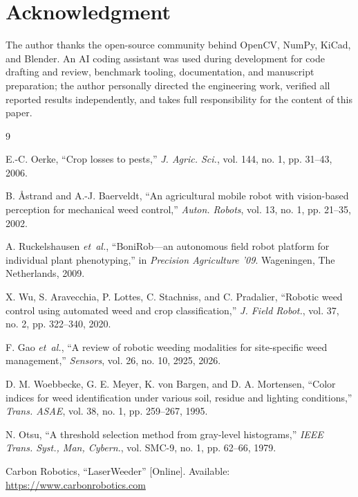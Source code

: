 \documentclass[conference]{IEEEtran}
\begin{document}
\section*{Acknowledgment}
The author thanks the open-source community behind OpenCV, NumPy, KiCad,
and Blender. An AI coding assistant was used during development for
code drafting and review, benchmark tooling, documentation, and manuscript
preparation; the author personally directed the engineering work, verified
all reported results independently, and takes full responsibility for the
content of this paper.


\begin{thebibliography}{9}

 E.-C. Oerke, ``Crop losses to pests,'' \emph{J. Agric.
Sci.}, vol. 144, no. 1, pp. 31--43, 2006.

 B. \AA strand and A.-J. Baerveldt, ``An agricultural
mobile robot with vision-based perception for mechanical weed control,''
\emph{Auton. Robots}, vol. 13, no. 1, pp. 21--35, 2002.

 A. Ruckelshausen \emph{et~al.}, ``BoniRob---an
autonomous field robot platform for individual plant phenotyping,''
in \emph{Precision Agriculture '09}. Wageningen, The Netherlands, 2009.

 X. Wu, S. Aravecchia, P. Lottes, C. Stachniss, and
C. Pradalier, ``Robotic weed control using automated weed and crop
classification,'' \emph{J. Field Robot.}, vol. 37, no. 2, pp. 322--340,
2020.

 F. Gao \emph{et~al.}, ``A review of robotic weeding
modalities for site-specific weed management,'' \emph{Sensors},
vol. 26, no. 10, 2925, 2026.

 D. M. Woebbecke, G. E. Meyer, K. von Bargen, and
D. A. Mortensen, ``Color indices for weed identification under various soil,
residue and lighting conditions,'' \emph{Trans. ASAE}, vol. 38, no. 1,
pp. 259--267, 1995.

 N. Otsu, ``A threshold selection method from gray-level
histograms,'' \emph{IEEE Trans. Syst., Man, Cybern.}, vol. SMC-9, no. 1,
pp. 62--66, 1979.

 Carbon Robotics, ``LaserWeeder'' [Online].
Available: \url{https://www.carbonrobotics.com}

\end{thebibliography}
\end{document}
